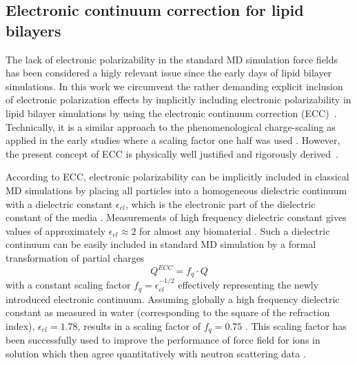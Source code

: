 \documentclass[aip,jcp,twocolumn]{revtex4}
\begin{document}
\subsection{Electronic continuum correction for lipid bilayers}\label{section:ecc}
The lack of electronic polarizability in the standard MD simulation
force fields has been considered a higly relevant issue since the early days of
lipid bilayer simulations.
In this work we circumvent the rather demanding explicit inclusion
of electronic polarization effects \cite{chowdhary13} by implicitly including
electronic polarizability in lipid
bilayer simulations by using the electronic continuum correction
(ECC)~\cite{leontyev11}. 
Technically, it is a similar approach to the phenomenological charge-scaling as applied in 
the early studies where a scaling factor one half was used \cite{jonsson86,egberts94}.
However, the present concept of ECC is 
physically well justified and rigorously derived~\cite{leontyev09, leontyev10, leontyev11}.


According to ECC, electronic
polarizability can be implicitly included in classical MD simulations by
placing all particles into a homogeneous dielectric continuum 
with a dielectric constant $\epsilon _{el}$, 
which is the electronic part of the dielectric constant of 
the media \cite{leontyev11}. Measurements of high frequency 
dielectric constant gives values of approximately $\epsilon _{el} \approx 2$ 
for almost any biomaterial \cite{some_original_work, leontyev11}.
Such a dielectric continuum can be easily included in standard MD simulation by
a formal transformation of partial charges 
\begin{equation}
  Q^{ECC} = f_q \cdot Q
\end{equation}
with a constant scaling factor $f_q = \epsilon _{el} ^{-1/2}$ 
effectively representing the newly introduced electronic continuum. 
Assuming globally a  high frequency dielectric constant as measured in water (corresponding to the square of the refraction index),  $\epsilon _{el} = 1.78$, results 
in a scaling factor of $f_q = 0.75$ \cite{some_orig_source, leontyev11}. This scaling factor has been
successfully used to improve the performance of force field for ions in solution \cite{kohagen14,kohagen16,??} which then agree quantitatively with neutron scattering data \cite{kohagen14,kohagen16, Pluharova2014}. 
\end{document}
